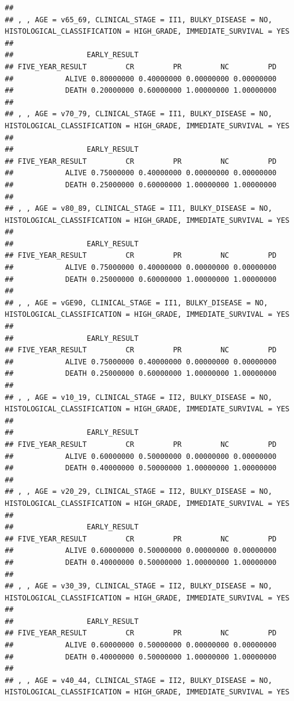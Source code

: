 \documentclass[]{article}
\begin{document}
\begin{verbatim}
## 
## , , AGE = v65_69, CLINICAL_STAGE = II1, BULKY_DISEASE = NO, HISTOLOGICAL_CLASSIFICATION = HIGH_GRADE, IMMEDIATE_SURVIVAL = YES
## 
##                 EARLY_RESULT
## FIVE_YEAR_RESULT         CR         PR         NC         PD
##            ALIVE 0.80000000 0.40000000 0.00000000 0.00000000
##            DEATH 0.20000000 0.60000000 1.00000000 1.00000000
## 
## , , AGE = v70_79, CLINICAL_STAGE = II1, BULKY_DISEASE = NO, HISTOLOGICAL_CLASSIFICATION = HIGH_GRADE, IMMEDIATE_SURVIVAL = YES
## 
##                 EARLY_RESULT
## FIVE_YEAR_RESULT         CR         PR         NC         PD
##            ALIVE 0.75000000 0.40000000 0.00000000 0.00000000
##            DEATH 0.25000000 0.60000000 1.00000000 1.00000000
## 
## , , AGE = v80_89, CLINICAL_STAGE = II1, BULKY_DISEASE = NO, HISTOLOGICAL_CLASSIFICATION = HIGH_GRADE, IMMEDIATE_SURVIVAL = YES
## 
##                 EARLY_RESULT
## FIVE_YEAR_RESULT         CR         PR         NC         PD
##            ALIVE 0.75000000 0.40000000 0.00000000 0.00000000
##            DEATH 0.25000000 0.60000000 1.00000000 1.00000000
## 
## , , AGE = vGE90, CLINICAL_STAGE = II1, BULKY_DISEASE = NO, HISTOLOGICAL_CLASSIFICATION = HIGH_GRADE, IMMEDIATE_SURVIVAL = YES
## 
##                 EARLY_RESULT
## FIVE_YEAR_RESULT         CR         PR         NC         PD
##            ALIVE 0.75000000 0.40000000 0.00000000 0.00000000
##            DEATH 0.25000000 0.60000000 1.00000000 1.00000000
## 
## , , AGE = v10_19, CLINICAL_STAGE = II2, BULKY_DISEASE = NO, HISTOLOGICAL_CLASSIFICATION = HIGH_GRADE, IMMEDIATE_SURVIVAL = YES
## 
##                 EARLY_RESULT
## FIVE_YEAR_RESULT         CR         PR         NC         PD
##            ALIVE 0.60000000 0.50000000 0.00000000 0.00000000
##            DEATH 0.40000000 0.50000000 1.00000000 1.00000000
## 
## , , AGE = v20_29, CLINICAL_STAGE = II2, BULKY_DISEASE = NO, HISTOLOGICAL_CLASSIFICATION = HIGH_GRADE, IMMEDIATE_SURVIVAL = YES
## 
##                 EARLY_RESULT
## FIVE_YEAR_RESULT         CR         PR         NC         PD
##            ALIVE 0.60000000 0.50000000 0.00000000 0.00000000
##            DEATH 0.40000000 0.50000000 1.00000000 1.00000000
## 
## , , AGE = v30_39, CLINICAL_STAGE = II2, BULKY_DISEASE = NO, HISTOLOGICAL_CLASSIFICATION = HIGH_GRADE, IMMEDIATE_SURVIVAL = YES
## 
##                 EARLY_RESULT
## FIVE_YEAR_RESULT         CR         PR         NC         PD
##            ALIVE 0.60000000 0.50000000 0.00000000 0.00000000
##            DEATH 0.40000000 0.50000000 1.00000000 1.00000000
## 
## , , AGE = v40_44, CLINICAL_STAGE = II2, BULKY_DISEASE = NO, HISTOLOGICAL_CLASSIFICATION = HIGH_GRADE, IMMEDIATE_SURVIVAL = YES

\end{verbatim}
\end{document}
